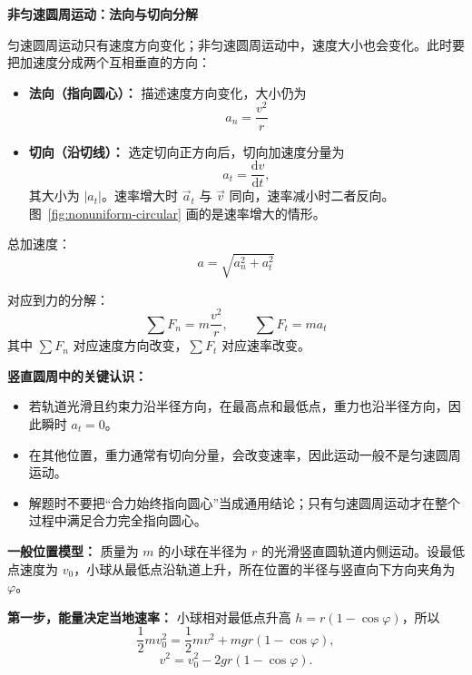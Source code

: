 \begin{competitionbox}
\textbf{非匀速圆周运动：法向与切向分解}

匀速圆周运动只有速度方向变化；非匀速圆周运动中，速度大小也会变化。此时要把加速度分成两个互相垂直的方向：

\begin{center}


\label{fig:nonuniform-circular}
\end{center}

\begin{itemize}
  \item \textbf{法向（指向圆心）：} 描述速度方向变化，大小仍为
  \[
  a_n=\frac{v^2}{r}
  \]
  \item \textbf{切向（沿切线）：} 选定切向正方向后，切向加速度分量为
  \[
  a_t=\frac{\mathrm dv}{\mathrm dt},
  \]
  其大小为 $\left|a_t\right|$。速率增大时 $\vec a_t$ 与 $\vec v$ 同向，速率减小时二者反向。图~\ref{fig:nonuniform-circular} 画的是速率增大的情形。
\end{itemize}

总加速度：
\[
a = \sqrt{a_n^2 + a_t^2}
\]

对应到力的分解：
\[
\sum F_n=m\frac{v^2}{r},\qquad \sum F_t=ma_t
\]
其中 $\sum F_n$ 对应速度方向改变，$\sum F_t$ 对应速率改变。

\textbf{竖直圆周中的关键认识：}
\begin{itemize}
  \item 若轨道光滑且约束力沿半径方向，在最高点和最低点，重力也沿半径方向，因此瞬时 $a_t=0$。
  \item 在其他位置，重力通常有切向分量，会改变速率，因此运动一般不是匀速圆周运动。
  \item 解题时不要把“合力始终指向圆心”当成通用结论；只有匀速圆周运动才在整个过程中满足合力完全指向圆心。
\end{itemize}

\textbf{一般位置模型：} 质量为 $m$ 的小球在半径为 $r$ 的光滑竖直圆轨道内侧运动。设最低点速度为 $v_0$，小球从最低点沿轨道上升，所在位置的半径与竖直向下方向夹角为 $\varphi$。

\begin{center}

\end{center}

\textbf{第一步，能量决定当地速率：} 小球相对最低点升高
$h=r(1-\cos\varphi)$，所以
\[
\frac12mv_0^2
=\frac12mv^2+mgr(1-\cos\varphi),
\]
\[
v^2=v_0^2-2gr(1-\cos\varphi).
\]


\end{competitionbox}
